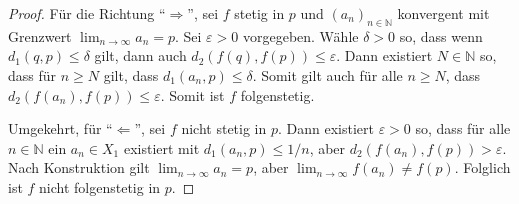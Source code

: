 \documentclass[../main.tex]{subfiles}
\begin{document}
\begin{proof}
  Für die Richtung ``$\Rightarrow$'',
  sei $f$ stetig in $p$ und ${(a_{n})}_{n \in \mathbb{N}}$
  konvergent mit Grenzwert 
  $\lim_{n \to \infty} a_n = p$.
  Sei $\varepsilon > 0$ vorgegeben.
  Wähle $\delta > 0$ so, dass wenn
  $d_1(q, p) \leq \delta$ gilt,
  dann auch $d_2(f(q), f(p)) \leq \varepsilon$.
  Dann existiert $N \in \mathbb{N}$ so,
  dass für $n \geq N$ gilt, dass
  $d_1(a_n, p) \leq \delta$.
  Somit gilt auch für alle $n \geq N$,
  dass $d_2(f(a_n), f(p)) \leq \varepsilon$.
  Somit ist $f$ folgenstetig.

  Umgekehrt, für ``$\Leftarrow$'',
  sei $f$ nicht stetig in $p$.
  Dann existiert $\varepsilon > 0$ so,
  dass für alle $n \in \mathbb{N}$ ein
  $a_n \in X_1$ existiert mit
  $d_1(a_n, p) \leq 1/n$, aber
  $d_2(f(a_n), f(p)) > \varepsilon$.
  Nach Konstruktion gilt
  $\lim_{n \to \infty}a_n = p$,
  aber $\lim_{n \to \infty}f(a_n) \neq f(p)$.
  Folglich ist $f$ nicht folgenstetig in $p$.
\end{proof}
\end{document}
